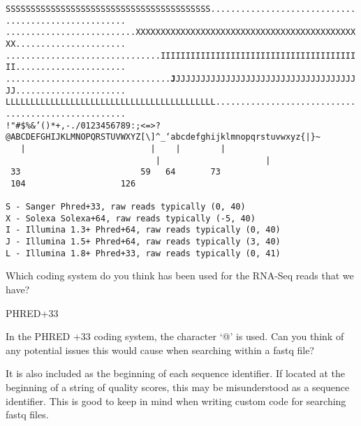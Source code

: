 \scriptsize
\texttt{SSSSSSSSSSSSSSSSSSSSSSSSSSSSSSSSSSSSSSSSS..................................................... \\
..........................XXXXXXXXXXXXXXXXXXXXXXXXXXXXXXXXXXXXXXXXXXXXXX...................... \\
...............................IIIIIIIIIIIIIIIIIIIIIIIIIIIIIIIIIIIIIIIII...................... \\
.................................\textbf{J}JJJJJJJJJJJJJJJJJJJJJJJJJJJJJJJJJJJJJJ...................... \\
LLLLLLLLLLLLLLLLLLLLLLLLLLLLLLLLLLLLLLLLLL.................................................... \\
!"\#\$\%\&'()*+,-./0123456789:;\textless =\textgreater?@ABCDEFGHIJKLMNOPQRSTUVWXYZ[\textbackslash]\^{}_`abcdefghijklmnopqrstuvwxyz\{|\}\~{}} \\
\texttt{
~~|~~~~~~~~~~~~~~~~~~~~~~~~~|~~~~|~~~~~~~~|~~~~~~~~~~~~~~~~~~~~~~~~~~~~~~|~~~~~~~~~~~~~~~~~~~~~|~\\
~33~~~~~~~~~~~~~~~~~~~~~~~~59~~~64~~~~~~~73~~~~~~~~~~~~~~~~~~~~~~~~~~~~104~~~~~~~~~~~~~~~~~~~126~\\
~ \\
 S - Sanger        Phred+33,  raw reads typically (0, 40) \\
 X - Solexa        Solexa+64, raw reads typically (-5, 40) \\
 I - Illumina 1.3+ Phred+64,  raw reads typically (0, 40) \\ 
 J - Illumina 1.5+ Phred+64,  raw reads typically (3, 40) \\
 L - Illumina 1.8+ Phred+33,  raw reads typically (0, 41) \\
}
\normalsize

\begin{questions}
Which coding system do you think has been used for the RNA-Seq reads that we have? \\
\begin{answer}
PHRED+33
\end{answer}
In the PHRED +33 coding system, the character `@' is used.
Can you think of any potential issues this would cause when searching within a fastq file? \\
\begin{answer}
It is also included as the beginning of each sequence identifier.
If located at the beginning of a string of quality scores, this may be misunderstood as a sequence identifier.
This is good to keep in mind when writing custom code for searching fastq files.
\end{answer}
\end{questions}

